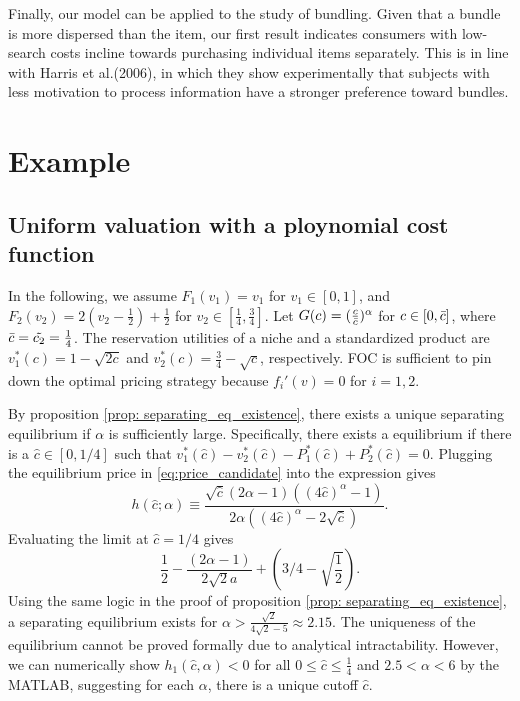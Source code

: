 \documentclass[14pt]{article}
\theoremstyle{plain}
\theoremstyle{definition}
\theoremstyle{remark}
\DeclareRobustCommand\1{\futurelet\oneNext\oneCheck}
\begin{document}
Finally, our model can be applied to the study of bundling. Given that a bundle is more dispersed than the item, our first result indicates consumers with low-search costs incline towards purchasing individual items separately. This is in line with Harris et al.(2006), in which they show experimentally that subjects with less motivation to process information have a stronger preference toward bundles.

\section{Example}\label{section: example}
\subsection{Uniform valuation with a ploynomial cost function}
In the following, we assume $F_1(v_1) =v_1$ for $v_1\in [0,1]$, and $F_2(v_2)= 2(v_2-\frac{1}{2}) + \frac{1}{2}$ for $v_2 \in [\frac{1}{4}, \frac{3}{4}]$. Let $G(c) = (\frac{c}{\Bar{c}})^{\alpha}$ for $c\in [0, \Bar{c}]$, where $ \Bar{c}= \tilde{c_2} = \frac{1}{4}$. The reservation utilities of a niche and a standardized product are $v_1^*(c)=1-\sqrt{2c}$ and $v_2^*(c)=\frac{3}{4}-\sqrt{c}$, respectively.
FOC is sufficient to pin down the optimal pricing strategy because $f_i'(v)=0$ for $i=1, 2$.

By proposition \ref{prop: separating_eq_existence},
there exists a unique separating equilibrium if $\alpha$ is sufficiently large. Specifically, there exists a equilibrium if there is a $\hat{c}\in [0,1/4]$ such that $v_1^*(\hat{c})-v_2^*(\hat{c})-P_1^*(\hat{c})+P_2^*(\hat{c})=0$. Plugging the equilibrium price in \eqref{eq:price_candidate} into the expression gives
\[h(\hat{c};\alpha)\equiv
\frac{\sqrt{\hat{c}}(2\alpha-1)((4\hat{c})^\alpha-1)}{2\alpha\left((4\hat{c})^{\alpha}-2\sqrt{\hat{c}}\right)}.
\]
Evaluating the limit at $\hat{c}=1/4$ gives 
\[
\frac{1}{2} -\frac{(2\alpha -1)}{2\sqrt{2}a}+(3/4-\sqrt{\frac{1}{2}}).
\]
Using the same logic in the proof of proposition \ref{prop: separating_eq_existence}, a separating equilibrium exists for $\alpha>\frac{\sqrt{2}}{4\sqrt{2}-5}\approx 2.15$. The uniqueness of the equilibrium cannot be proved formally due to analytical intractability. However, we can numerically show $h_1(\hat{c},\alpha)<0$ for all $0\leq\hat{c}\leq \frac{1}{4}$ and $2.5<\alpha<6$ by the MATLAB, suggesting for each $\alpha$, there is a unique cutoff $\hat{c}$.
\end{document}
